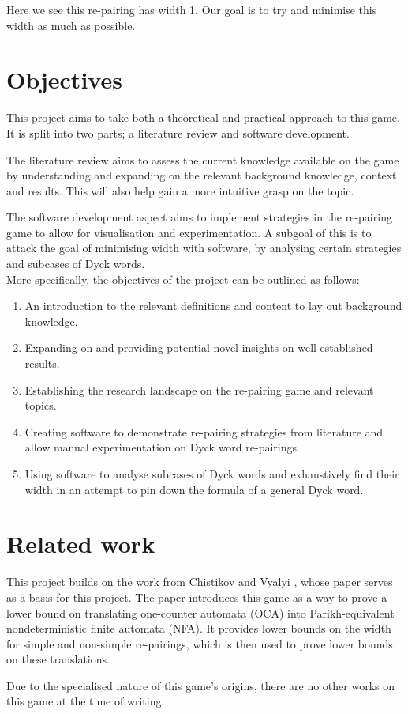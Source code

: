 \noindent Here we see this re-pairing has width 1. Our goal is to try and minimise this width as much as possible. 


\section{Objectives}

This project aims to take both a theoretical and practical approach to this game. It is split into two parts; a literature review and software development.

The literature review aims to assess the current knowledge available on the game by understanding and expanding on the relevant background knowledge, context and results. This will also help gain a more intuitive grasp on the topic. 

The software development aspect aims to implement strategies in the re-pairing game to allow for visualisation and experimentation. A subgoal of this is to attack the goal of minimising width with software, by analysing certain strategies and subcases of Dyck words. \\
More specifically, the objectives of the project can be outlined as follows:

\begin{enumerate}
    \item An introduction to the relevant definitions and content to lay out background knowledge.
    \item Expanding on and providing potential novel insights on well established results.
    \item Establishing the research landscape on the re-pairing game and relevant topics.
    \item Creating software to demonstrate re-pairing strategies from literature and allow manual experimentation on Dyck word re-pairings.
    \item Using software to analyse subcases of Dyck words and exhaustively find their width in an attempt to pin down the formula of a general Dyck word.
\end{enumerate}

\section{Related work}
This project builds on the work from Chistikov and Vyalyi \cite{chistikov2020re}, whose paper serves as a basis for this project. The paper introduces this game as a way to prove a lower bound on translating one-counter automata (OCA) into Parikh-equivalent nondeterministic finite automata (NFA). It provides lower bounds on the width for simple and non-simple re-pairings, which is then used to prove lower bounds on these translations.

Due to the specialised nature of this game's origins, there are no other works on this game at the time of writing.